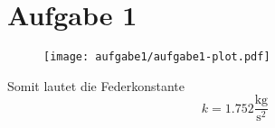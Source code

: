 \documentclass{article}
\begin{document}
\section*{Aufgabe 1}
\begin{figure}[H]
	\centering
	\texttt{[image: aufgabe1/aufgabe1-plot.pdf]}
\end{figure}
Somit lautet die Federkonstante
\[
	k = 1.752 \frac{\si{\kg}}{\si{\second^2}}
\]
\end{document}
